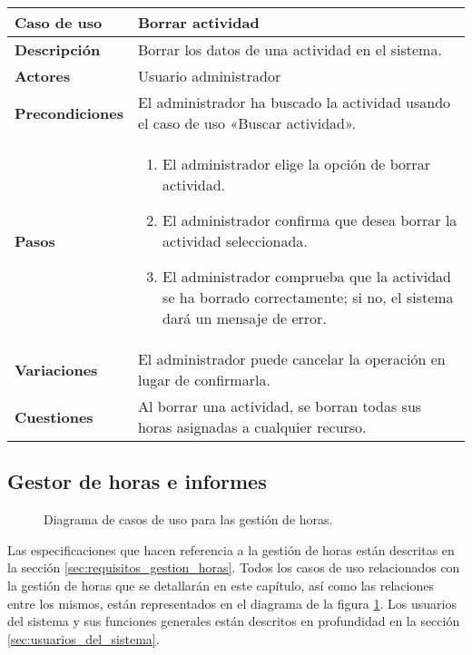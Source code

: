 \begin{tabular}{|p{1.25in}|p{3.65in}|}\hline
\textbf{Caso de uso} & \textbf{Borrar actividad}\\\hline\hline
\textbf{Descripción} & Borrar los datos de una actividad en el sistema. \\\hline
\textbf{Actores} & Usuario administrador\\\hline
\textbf{Precondiciones} & El administrador ha
buscado la actividad usando el caso de uso «Buscar actividad».\\\hline
\textbf{Pasos} &
  \begin{enumerate}
   \item El administrador elige la opción de borrar actividad.
   \item El administrador confirma que desea borrar la actividad seleccionada.
   \item El administrador comprueba que la actividad se ha borrado
correctamente; si no, el sistema dará un mensaje de error.
  \end{enumerate}
\\\hline
\textbf{Variaciones} & El administrador puede cancelar la operación en lugar
de confirmarla.\\\hline
\textbf{Cuestiones} & Al borrar una actividad, se borran todas sus horas
asignadas a cualquier recurso.\\\hline
\end{tabular}

\subsection{Gestor de horas e informes}

\begin{figure}
\centering
{}
\caption{Diagrama de casos de uso para las gestión de horas.}
\label{fig:CU_horas}
\end{figure}

Las especificaciones que hacen referencia a la gestión de horas están
descritas en la sección \ref{sec:requisitos_gestion_horas}. Todos los casos de
uso relacionados con la gestión de horas que se detallarán en este
capítulo, así como las relaciones entre los mismos, están representados en el
diagrama de la figura \ref{fig:CU_horas}. Los usuarios del sistema y sus
funciones generales están descritos en profundidad en la sección
\ref{sec:usuarios_del_sistema}.

